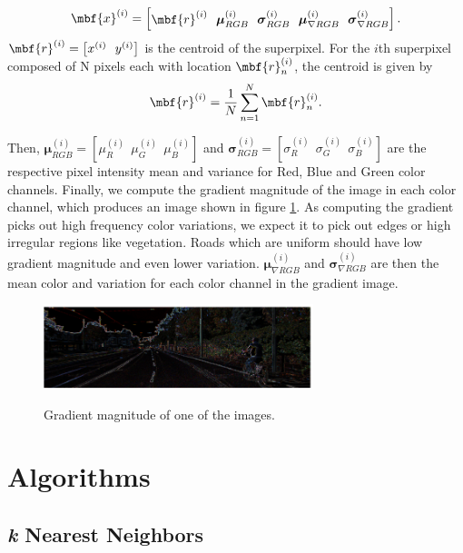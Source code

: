 \documentclass{article} %
\newcommand{\bs}[1]{\boldsymbol{#1}}
\begin{document}
\begin{equation}
 \mbf{x}^{(i)} = 
 \begin{bmatrix}\mbf{r}^{(i)}~~\bs{\mu}_{RGB}^{(i)}~~\bs{\sigma}_{RGB}^{(i)}~~\bs{\mu}_{\nabla RGB}^{(i)}~~\bs{\sigma}_{\nabla RGB}^{(i)}  \end{bmatrix}.
\end{equation}
$\mbf{r}^{(i)}=\left[x^{(i)}~~ y^{(i)}\right]$ is the centroid of the superpixel. For the $i$th superpixel composed of N pixels each with location $\mbf{r}^{(i)}_n$, the centroid is given by
\begin{equation}
 \mbf{r}^{(i)} = \frac{1}{N}\sum_{n=1}^N \mbf{r}^{(i)}_n.
\end{equation}

Then, $\bs{\mu}_{RGB}^{(i)} = \left[\mu_{R}^{(i)}~~\mu_{G}^{(i)} ~~\mu_{B}^{(i)}  \right]$ and $\bs{\sigma}_{RGB}^{(i)} = \left[\sigma_{R}^{(i)}~~\sigma_{G}^{(i)} ~~\sigma_{B}^{(i)}  \right]$ are the respective pixel intensity mean and variance for Red, Blue and Green color channels. Finally, we compute the gradient magnitude of the image in each color channel, which produces an image shown in figure \ref{fig:grad}. As computing the gradient picks out high frequency color variations, we expect it to pick out edges or high irregular regions like vegetation. Roads which are uniform should have low gradient magnitude and even lower variation. $\bs{\mu}_{\nabla RGB}^{(i)}$ and $\bs{\sigma}_{\nabla RGB}^{(i)}$ are then the mean color and variation for each color channel in the gradient image.

\begin{figure}[ht!]
\centering
 \includegraphics[width=0.7\textwidth]{figs/grad.pdf}\\
 \caption{Gradient magnitude of one of the images.}\label{fig:grad}
\end{figure}



\section{Algorithms}
\subsection{\textit{k} Nearest Neighbors}
\end{document}
